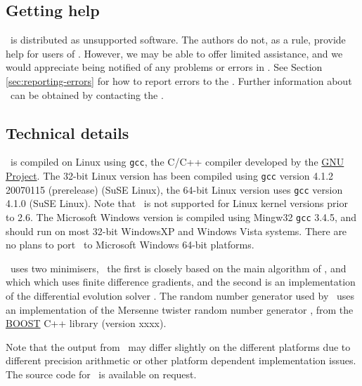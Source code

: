 \subsection{Getting help}

\SPM\ is distributed as unsupported software. The authors do not, as a rule, provide help for users of \SPM. However, we may be able to offer limited assistance, and we would appreciate being notified of any problems or errors in \SPM. See Section \ref{sec:reporting-errors} for how to report errors to the \authors. Further information about \SPM\ can be obtained by contacting the \authors.

\subsection{Technical details}

\SPM\ is compiled on Linux using \texttt{gcc}, the C/C++ compiler developed by the \href{http://gcc.gnu.org}{GNU Project}. The 32-bit Linux version has been compiled using \texttt{gcc} version 4.1.2 20070115 (prerelease) (SuSE Linux), the 64-bit Linux version uses \texttt{gcc} version 4.1.0 (SuSE Linux). Note that \SPM\ is not supported for Linux kernel versions prior to 2.6. The Microsoft Windows version is compiled using Mingw32 \texttt{gcc} 3.4.5, and should run on most 32-bit WindowsXP and Windows Vista systems. There are no plans to port \SPM\ to Microsoft Windows 64-bit platforms. 

\SPM\ uses two minimisers, \textemdash\ the first is closely based on the main algorithm of \cite{779}, and which which uses finite difference gradients, and the second is an implementation of the differential evolution solver \citep{1442}. The random number generator used by \SPM\ uses an implementation of the Mersenne twister random number generator \citep{796}, from the \href{http://www.boost.org/}{BOOST} C++ library (version xxxx).

Note that the output from \SPM\ may differ slightly on the different platforms due to different precision arithmetic or other platform dependent implementation issues. The source code for \SPM\ is available on request.


